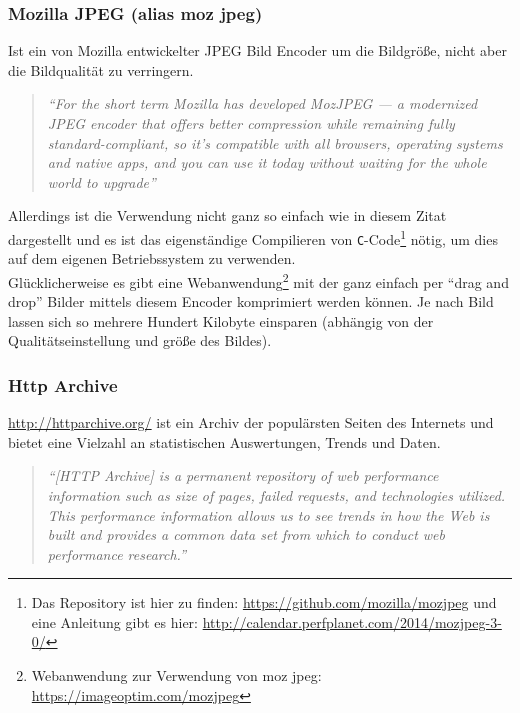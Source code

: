 
		\subsubsection{Mozilla JPEG (alias moz jpeg)} %
		\label{ssub:moz_jpeg}
			Ist ein von Mozilla entwickelter JPEG Bild Encoder um die Bildgröße, nicht aber die Bildqualität zu verringern.

			\begin{quote}
				\textit{"`For the short term Mozilla has developed MozJPEG — a modernized JPEG encoder that offers better compression while remaining fully standard-compliant, so it’s compatible with all browsers, operating systems and native apps, and you can use it today without waiting for the whole world to upgrade"'\autocite{mozJPEG}}
			\end{quote}

			Allerdings ist die Verwendung nicht ganz so einfach wie in diesem Zitat dargestellt und es ist das eigenständige Compilieren von \texttt{C}-Code\footnote{Das Repository ist hier zu finden: \url{https://github.com/mozilla/mozjpeg} und eine Anleitung gibt es hier: \url{http://calendar.perfplanet.com/2014/mozjpeg-3-0/}} nötig, um dies auf dem eigenen Betriebssystem zu verwenden.\\
			Glücklicherweise es gibt eine Webanwendung\footnote{Webanwendung zur Verwendung von moz jpeg: \url{https://imageoptim.com/mozjpeg}} mit der ganz einfach per "`drag and drop"' Bilder mittels diesem Encoder komprimiert werden können. Je nach Bild lassen sich so mehrere Hundert Kilobyte einsparen (abhängig von der Qualitätseinstellung und größe des Bildes).
		

		\subsubsection{Http Archive} %
		\label{ssub:http_archive_bigqueri_es}
			\url{http://httparchive.org/} ist ein Archiv der populärsten Seiten des Internets und bietet eine Vielzahl an statistischen Auswertungen, Trends und Daten.
			\begin{quote}
				\textit{"`[HTTP Archive] is a permanent repository of web performance information such as size of pages, failed requests, and technologies utilized. This performance information allows us to see trends in how the Web is built and provides a common data set from which to conduct web performance research."' \autocite{httpArchive}}
			\end{quote}
			

